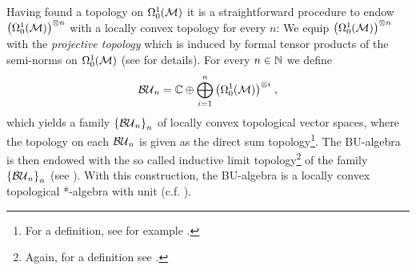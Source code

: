 Having found a topology on $\Omega^1_0(\mathcal{M})$ it is a straightforward procedure to endow $\big(\Omega^1_0(\mathcal{M})\big)^{\otimes n}$ with a locally convex topology for every $n$: We equip $\big(\Omega^1_0(\mathcal{M})\big)^{\otimes n}$ with the \emph{projective topology} which is induced by formal tensor products of the semi-norms on $\Omega^1_0(\mathcal{M})$ (see \cite[Definition 43.2 and Chapter 43]{treves} for details).  For every $n \in \mathbb{N}$ we define
\begin{align}
	\mathcal{BU}_n = \mathbb{C} \oplus \bigoplus_{i=1}^n \big(\Omega^1_0(\mathcal{M})\big)^{\otimes i} \;,
\end{align}
which yields a family $\left\{\mathcal{BU}_n\right\}_n$ of locally convex topological vector spaces, where the topology on each $\mathcal{BU}_n$ is given as the direct sum topology\footnote{For a definition, see for example \cite[515]{treves}.}.
The BU-algebra is then endowed with the so called inductive limit topology\footnote{Again, for a definition see \cite[514]{treves}.} of the family $\left\{\mathcal{BU}_n\right\}_n$ (see \cite[Appendix B]{verch_sahlman}). With this construction, the BU-algebra is a locally convex topological *-algebra with unit (c.f. \cite[Lemma 4.1]{verch_sahlman}).
%
%
%
%
%
